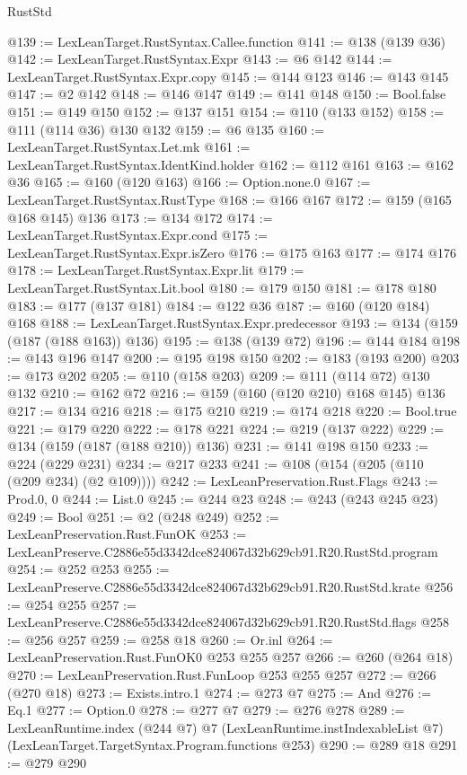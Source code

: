 \begin{lexlean}{RustStd}
\begin{coremodule}
@139 := LexLeanTarget.RustSyntax.Callee.function
@141 := @138 (@139 @36)
@142 := LexLeanTarget.RustSyntax.Expr
@143 := @6 @142
@144 := LexLeanTarget.RustSyntax.Expr.copy
@145 := @144 @123
@146 := @143 @145
@147 := @2 @142
@148 := @146 @147
@149 := @141 @148
@150 := Bool.false
@151 := @149 @150
@152 := @137 @151
@154 := @110 (@133 @152)
@158 := @111 (@114 @36) @130 @132
@159 := @6 @135
@160 := LexLeanTarget.RustSyntax.Let.mk
@161 := LexLeanTarget.RustSyntax.IdentKind.holder
@162 := @112 @161
@163 := @162 @36
@165 := @160 (@120 @163)
@166 := Option.none.{0}
@167 := LexLeanTarget.RustSyntax.RustType
@168 := @166 @167
@172 := @159 (@165 @168 @145) @136
@173 := @134 @172
@174 := LexLeanTarget.RustSyntax.Expr.cond
@175 := LexLeanTarget.RustSyntax.Expr.isZero
@176 := @175 @163
@177 := @174 @176
@178 := LexLeanTarget.RustSyntax.Expr.lit
@179 := LexLeanTarget.RustSyntax.Lit.bool
@180 := @179 @150
@181 := @178 @180
@183 := @177 (@137 @181)
@184 := @122 @36
@187 := @160 (@120 @184) @168
@188 := LexLeanTarget.RustSyntax.Expr.predecessor
@193 := @134 (@159 (@187 (@188 @163)) @136)
@195 := @138 (@139 @72)
@196 := @144 @184
@198 := @143 @196 @147
@200 := @195 @198 @150
@202 := @183 (@193 @200)
@203 := @173 @202
@205 := @110 (@158 @203)
@209 := @111 (@114 @72) @130 @132
@210 := @162 @72
@216 := @159 (@160 (@120 @210) @168 @145) @136
@217 := @134 @216
@218 := @175 @210
@219 := @174 @218
@220 := Bool.true
@221 := @179 @220
@222 := @178 @221
@224 := @219 (@137 @222)
@229 := @134 (@159 (@187 (@188 @210)) @136)
@231 := @141 @198 @150
@233 := @224 (@229 @231)
@234 := @217 @233
@241 := @108 (@154 (@205 (@110 (@209 @234) (@2 @109))))
@242 := LexLeanPreservation.Rust.Flags
@243 := Prod.{0, 0}
@244 := List.{0}
@245 := @244 @23
@248 := @243 (@243 @245 @23)
@249 := Bool
@251 := @2 (@248 @249)
@252 := LexLeanPreservation.Rust.FunOK
@253 := LexLeanPreserve.C2886e55d3342dce824067d32b629cb91.R20.RustStd.program
@254 := @252 @253
@255 := LexLeanPreserve.C2886e55d3342dce824067d32b629cb91.R20.RustStd.krate
@256 := @254 @255
@257 := LexLeanPreserve.C2886e55d3342dce824067d32b629cb91.R20.RustStd.flags
@258 := @256 @257
@259 := @258 @18
@260 := Or.inl
@264 := LexLeanPreservation.Rust.FunOK0 @253 @255 @257
@266 := @260 (@264 @18)
@270 := LexLeanPreservation.Rust.FunLoop @253 @255 @257
@272 := @266 (@270 @18)
@273 := Exists.intro.{1}
@274 := @273 @7
@275 := And
@276 := Eq.{1}
@277 := Option.{0}
@278 := @277 @7
@279 := @276 @278
@289 := LexLeanRuntime.index
    (@244 @7)
    @7
    (LexLeanRuntime.instIndexableList @7)
    (LexLeanTarget.TargetSyntax.Program.functions @253)
@290 := @289 @18
@291 := @279 @290

\end{coremodule}
\end{lexlean}
